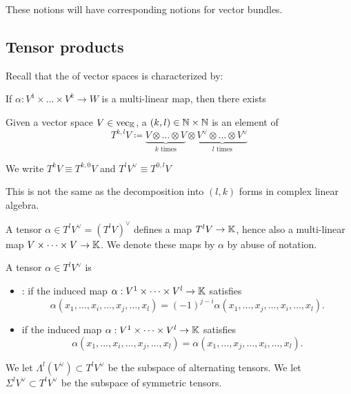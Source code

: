 These notions will have corresponding notions for vector bundles.

\subsection{Tensor products}

Recall that the  of vector spaces is characterized by:

 If \(\alpha:V^1\times \dots\times V^k\to W\) is a 
multi-linear map, then there exists 
\begin{center}
\end{center}

\begin{definition*}
    Given a vector space \(V\in \text{vec}_{\mathbb{K}}\), a  
    \((k,l)\in \mathbb{N}\times \mathbb{N}\) is an element of 
    \[T^{k,l}V\coloneqq \underbrace{V\otimes \dots \otimes V}_{k\text{ times}}\otimes \underbrace{V^\vee\otimes \dots \otimes V^\vee}_{l\text{ times}}\]   
\end{definition*}

We write \(T^kV\equiv T^{k,0}V\) and \(T^lV^\vee\equiv T^{0,l}V\)

\begin{remark}
    This is not the same as the decomposition into \((l,k)\) forms in complex linear algebra. 
\end{remark}

A tensor \(\alpha\in T^lV^\vee=(T^l V)^\vee\) defines a map \(T^lV\to \mathbb{K}\), hence also 
a multi-linear map \(V\times \dots\times V\to \mathbb{K}\). We denote these maps by \(\alpha\) by abuse of notation.

\begin{definition*}
    A tensor \(\alpha\in T^l V^\vee\) is 
    \begin{itemize}
        \item {}: if the induced map \(\alpha:V^1\times \dots\times V^l\to\mathbb{K}\) satisfies 
            \[\alpha(x_1,\dots,x_i,\dots,x_j,\dots,x_l)=(-1)^{j-i}\alpha(x_1,\dots,x_j,\dots,x_i,\dots,x_l).\]
        \item {} if the induced map \(\alpha:V^1\times \dots\times V^l\to\mathbb{K}\) satisfies 
            \[\alpha(x_1,\dots,x_i,\dots,x_j,\dots,x_l)=\alpha(x_1,\dots,x_j,\dots,x_i,\dots,x_l).\]
    \end{itemize}
    We let \(\Lambda^l(V^\vee)\subset T^l V^\vee\) be the subspace of alternating tensors. We let \(\Sigma^lV^\vee\subset T^l V^\vee\)
    be the subspace of symmetric tensors.
\end{definition*}

